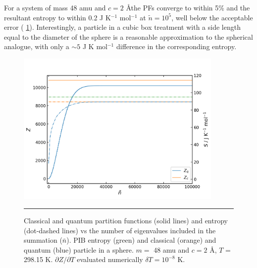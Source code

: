 \documentclass[../main.tex]{subfiles}
\begin{document}
For a system of mass 48 amu and $c = 2$ \AA the PFs converge to within 5\% and the resultant entropy to within 0.2 J K$^{-1}$ mol$^{-1}$ at $\tilde{n} = 10^5$, well below the acceptable error (\figurename{ \ref{spherical_well_z_s_qunat_classical}}). Interestingly, a particle in a cubic box treatment with a side length equal to the diameter of the sphere is a reasonable approximation to the spherical analogue, with only a $\sim 5$ J K mol$^{-1}$ difference in the corresponding entropy.

\begin{figure}[h!]
	\centering
	\includegraphics[height=7.5cm]{4/figs/spherical_well_z_s_qunat_classical}
	\vspace{0.2cm}
	\hrule
	\caption{Classical and quantum partition functions (solid lines) and entropy (dot-dashed lines) vs the number of eigenvalues included in the summation ($\bar{n}$). PIB entropy (green) and classical (orange) and quantum (blue) particle in a sphere. $m =$ 48 amu and $c = 2$ \AA, $T$ = 298.15 K. $\partial Z / \partial T$ evaluated numerically $\delta T = 10^{-8}$ K.} 
	\label{spherical_well_z_s_qunat_classical}
\end{figure}
\end{document}

